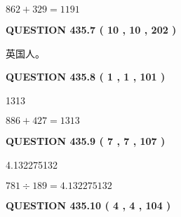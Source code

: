 \documentclass{ctexart}
\begin{document}
 
 
 
\noindent{}

$ %
862 +  %
329=   %
1191$
 
 
  
\vspace{0.2in}
  
{\textbf{\Large{QUESTION
435.7 
 ( 10 , 10 , 202 )
}}}
  
  
 
 
\noindent{}
 
 
英国人。
 
 
 
 
  
\vspace{0.2in}
  
{\textbf{\Large{QUESTION
435.8 
 ( 1 , 1 , 101 )
}}}
  
  
 
 
\noindent{}

1313
 
 
 
 
\noindent{}

$ %
886 +  %
427=   %
1313$
 
 
  
\vspace{0.2in}
  
{\textbf{\Large{QUESTION
435.9 
 ( 7 , 7 , 107 )
}}}
  
  
 
 
\noindent{}

4.132275132
 
 
 
 
\noindent{}

$ %
781 \div  %
189=   %
4.132275132$
 
 
  
\vspace{0.2in}
  
{\textbf{\Large{QUESTION
435.10 
 ( 4 , 4 , 104 )
}}}
  
  
 
 
\noindent{}
\end{document}
